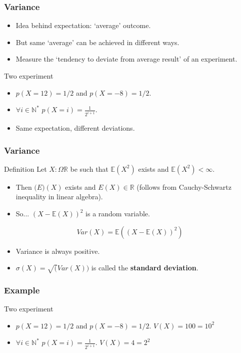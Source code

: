 \documentclass{beamer}
\begin{document}
\begin{frame}
  \frametitle{Variance}
  \begin{itemize}
  \item Idea behind expectation: `average' outcome.
  \item But same `average' can be achieved in different ways.
  \item Measure the `tendency to deviate from average result' of an experiment.
  \end{itemize}

  \begin{exampleblock}{Two experiment}
    \begin{itemize}
    \item $p(X = 12) = 1/2$ and $p(X=-8) = 1/2$.
    \item $\forall i \in \mathbb{N}^{*}$ $p(X = i)=\frac{1}{2^{i+1}}$.
    \item Same expectation, different deviations.
    \end{itemize}
  \end{exampleblock}
\end{frame}

\begin{frame}
  \frametitle{Variance}
  \begin{block}{Definition}
    Let $X: \Omega \mathbb{R}$ be such that $\mathbb{E}(X^2)$ exists and $\mathbb{E}(X^2) < \infty$.
    \begin{itemize}
    \item Then $\mathbb(E)(X)$ exists and $E(X) \in \mathbb{R}$ (follows from Cauchy-Schwartz inequality in linear algebra).
    \item So... $(X - \mathbb{E}(X))^2$ is a random variable.
    \end{itemize}
    \[Var(X) = \mathbb{E}((X - \mathbb{E}(X))^2)\]
  \end{block}
  \begin{itemize}
  \item Variance is always positive.
  \item $\sigma(X) = \sqrt(Var(X))$ is called the \textbf{standard deviation}.
  \end{itemize}
\end{frame}

\begin{frame}
  \frametitle{Example}
  \begin{exampleblock}{Two experiment}
      \begin{itemize}
        \item $p(X = 12) = 1/2$ and $p(X=-8) = 1/2$. \alert{$V(X) = 100 = 10^2$}
        \item $\forall i \in \mathbb{N}^{*}$ $p(X = i)=\frac{1}{2^{i+1}}$. \alert{$V(X) = 4 = 2^2$}
      \end{itemize}
    \end{exampleblock}
\end{frame}
\end{document}
